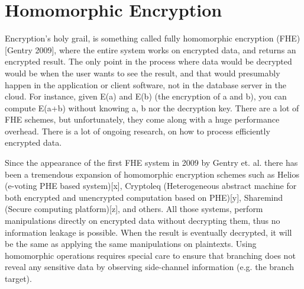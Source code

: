 \section{Homomorphic Encryption}
Encryption's holy grail, is something called fully homomorphic encryption (FHE) [Gentry 2009], where the entire system works on encrypted data, and returns an encrypted result.
The only point in the process where data would be decrypted would be when the user wants to see the result, and that would presumably happen in the application or client software, not in the database server in the cloud.
For instance, given E(a) and E(b) (the encryption of a and b), you can compute E(a+b) without knowing a, b nor the decryption key.
There are a lot of FHE schemes, but unfortunately, they come along with a huge performance overhead.
There is a lot of ongoing research, on how to process efficiently encrypted data.

Since the appearance of the first FHE system in 2009 by Gentry et. al. there has been a tremendous expansion of homomorphic encryption schemes such as Helios (e-voting PHE based system)[x], Cryptoleq (Heterogeneous abstract machine for both encrypted and unencrypted computation based on PHE)[y], Sharemind (Secure computing platform)[z], and others.
All those systems, perform manipulations directly on encrypted data without decrypting them, thus no information leakage is possible.
When the result is eventually decrypted, it will be the same as applying the same manipulations on plaintexts.
Using homomorphic operations requires special care to ensure that branching does not reveal any sensitive data by observing side-channel information (e.g. the branch target).
